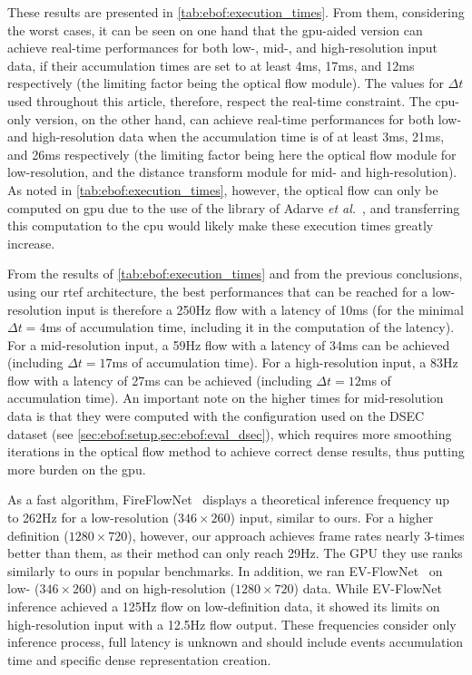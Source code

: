 These results are presented in \cref{tab:ebof:execution_times}. From them, considering the worst cases, it can be seen on one hand that the \acrshort{gpu}-aided version can achieve real-time performances for both low-, mid-, and high-resolution input data, if their accumulation times are set to at least 4ms, 17ms, and 12ms respectively (the limiting factor being the optical flow module). The values for \(\Delta t\) used throughout this article, therefore, respect the real-time constraint. The \acrshort{cpu}-only version, on the other hand, can achieve real-time performances for both low- and high-resolution data when the accumulation time is of at least 3ms, 21ms, and 26ms respectively (the limiting factor being here the optical flow module for low-resolution, and the distance transform module for mid- and high-resolution). As noted in \cref{tab:ebof:execution_times}, however, the optical flow can only be computed on \acrshort{gpu} due to the use of the library of Adarve \textit{et al.}~\cite{Adarve2016AFF}, and transferring this computation to the \acrshort{cpu} would likely make these execution times greatly increase.

From the results of \cref{tab:ebof:execution_times} and from the previous conclusions, using our \acrshort{rtef} architecture, the best performances that can be reached for a low-resolution input is therefore a 250Hz flow with a latency of 10ms (for the minimal \(\Delta t = 4\)ms of accumulation time, including it in the computation of the latency). For a mid-resolution input, a 59Hz flow with a latency of 34ms can be achieved (including \(\Delta t = 17\)ms of accumulation time). For a high-resolution input, a 83Hz flow with a latency of 27ms can be achieved (including \(\Delta t = 12\)ms of accumulation time). An important note on the higher times for mid-resolution data is that they were computed with the configuration used on the DSEC dataset (see \cref{sec:ebof:setup,sec:ebof:eval_dsec}), which requires more smoothing iterations in the optical flow method to achieve correct dense results, thus putting more burden on the \acrshort{gpu}.

As a fast algorithm, FireFlowNet~\cite{ParedesValls2021BackTE} displays a theoretical inference frequency up to 262Hz for a low-resolution (\(346\times260\)) input, similar to ours. For a higher definition (\(1280\times720\)), however, our approach achieves frame rates nearly 3-times better than them, as their method can only reach 29Hz. The GPU they use ranks similarly to ours in popular benchmarks. In addition, we ran EV-FlowNet~\cite{Zhu2018EVFlowNetSO} on low- (\(346\times260\)) and on high-resolution (\(1280\times720\)) data. While EV-FlowNet inference achieved a 125Hz flow on low-definition data, it showed its limits on high-resolution input with a 12.5Hz flow output. These frequencies consider only inference process, full latency is unknown and should include events accumulation time and specific dense representation creation.

